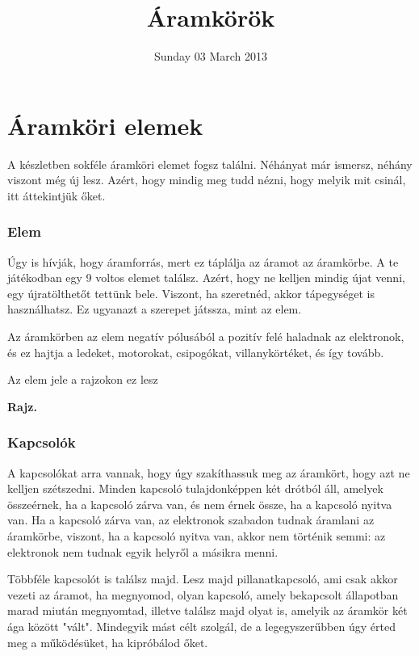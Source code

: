 \documentclass[16pt]{scrreprt}
\title{Áramkörök}
\date{Sunday 03 March 2013}
\author{}
\begin{document}
\maketitle

\section{Áramköri elemek}

A készletben sokféle áramköri elemet fogsz találni. Néhányat már ismersz, néhány viszont még új lesz. Azért, hogy mindig meg tudd nézni, hogy melyik mit csinál, itt áttekintjük őket.

\subsubsection{Elem}

Úgy is hívják, hogy áramforrás, mert ez táplálja az áramot az áramkörbe. A te játékodban egy 9 voltos elemet találsz. Azért, hogy ne kelljen mindig újat venni, egy újratölthetőt tettünk bele. Viszont, ha szeretnéd, akkor tápegységet is használhatsz. Ez ugyanazt a szerepet játssza, mint az elem. 



Az áramkörben az elem negatív pólusából a pozitív felé haladnak az elektronok, és ez hajtja a ledeket, motorokat, csipogókat, villanykörtéket, és így tovább. 

Az elem jele a rajzokon ez lesz

\textbf{Rajz.}

\subsubsection{Kapcsolók}

A kapcsolókat arra vannak, hogy úgy szakíthassuk meg az áramkört, hogy azt ne kelljen szétszedni. Minden kapcsoló tulajdonképpen két drótból áll, amelyek összeérnek, ha a kapcsoló zárva van, és nem érnek össze, ha a kapcsoló nyitva van. Ha a kapcsoló zárva van, az elektronok szabadon tudnak áramlani az áramkörbe, viszont, ha a kapcsoló nyitva van, akkor nem történik semmi: az elektronok nem tudnak egyik helyről a másikra menni. 

Többféle kapcsolót is találsz majd. Lesz majd pillanatkapcsoló, ami csak akkor vezeti az áramot, ha megnyomod, olyan kapcsoló, amely bekapcsolt állapotban marad miután megnyomtad, illetve találsz majd olyat is, amelyik az áramkör két ága között "vált". Mindegyik mást célt szolgál, de a legegyszerűbben úgy érted meg a működésüket, ha kipróbálod őket.
\end{document}
